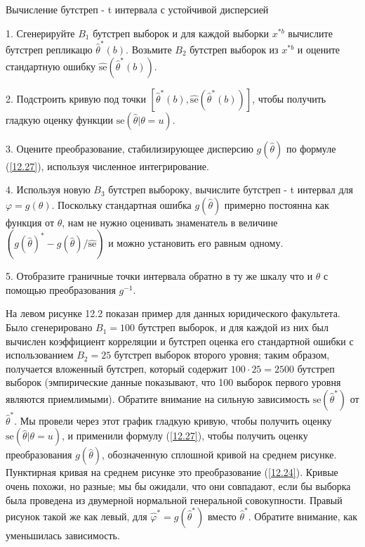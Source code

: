 \begin{algorithm}
\caption{Вычисление бутстреп - t интервала с устойчивой дисперсией}\label{12.1}
1. Сгенерируйте $B_{1}$ бутстреп выборок и для каждой выборки $x^{*b}$ вычислите бутстреп репликацю $\widehat{\theta}^{*}(b)$. Возьмите $B_{2}$ бутстреп выборок из $x^{*b}$ и оцените стандартную ошибку
$\widehat{\text{se}}(\widehat{\theta}^{*}(b))$.

2. Подстроить кривую под точки $[\widehat{\theta}^{*}(b), \widehat{\text{se}}(\widehat{\theta}^{*}(b))]$, чтобы получить гладкую оценку функции $\text{se}(\widehat{\theta}|\theta = u)$.

3. Оцените преобразование, стабилизирующее дисперсию $g(\widehat{\theta})$ по формуле (\ref{12.27}), используя численное интегрирование.

4. Используя новую $B_{3}$ бутстреп выбороку, вычислите бутстреп - t интервал для $\varphi = g(\theta)$. Поскольку стандартная ошибка $g(\widehat{\theta})$ примерно постоянна как функция от $\theta$, нам не нужно оценивать знаменатель в величине $(g(\widehat{\theta})^{*} - g(\widehat{\theta}) / \widehat{\text{se}})$ и можно установить его равным одному.

5. Отобразите граничные точки интервала обратно в ту же шкалу что и $\theta$ с помощью преобразования $g^{-1}$.
\end{algorithm}

На левом рисунке 12.2 показан пример для данных юридического факультета. Было сгенерировано $B_{1} = 100$ бутстреп выборок, и для каждой из них был вычислен коэффициент корреляции и бутстреп оценка его стандартной ошибки с использованием $B_{2} = 25$ бутстреп выборок второго уровня; таким образом, получается вложенный бутстреп, который содержит $100 \cdot 25 = 2500$ бутстреп выборок (эмпирические данные показывают, что 100 выборок первого уровня являются приемлимыми). Обратите внимание на сильную зависимость $\text{se}(\widehat{\theta}^{*})$ от ${\widehat{\theta}}^{*}$. Мы провели через этот график гладкую кривую, чтобы получить оценку $\text{se}(\widehat{\theta}|\theta = u)$, и применили формулу (\ref{12.27}), чтобы получить оценку преобразования $g(\widehat{\theta})$, обозначенную сплошной кривой на среднем рисунке. Пунктирная кривая на среднем рисунке это преобразование (\ref{12.24}). Кривые очень похожи, но разные; мы бы ожидали, что они совпадают, если бы выборка была проведена из двумерной нормальной генеральной совокупности. Правый рисунок такой же как левый, для $\widehat{\varphi}^{*} = g(\widehat{\theta}^{*})$ вместо $\widehat{\theta}^{*}$. Обратите внимание, как уменьшилась зависимость.

